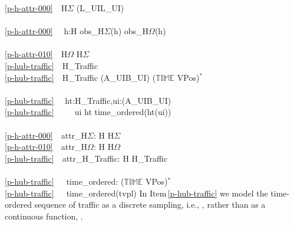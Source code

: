 {\ref{p-h-attr-000}\ \ H$\Sigma$ {\EQ} (L\_UI{\TIMES}L\_UI)\\
\\
\ref{p-h-attr-000}\ \ {\ALL} h:H {\RDOT} obs\_H$\Sigma$(h) {\ISIN} obs\_H$\Omega$(h)\\
\\
\ref{p-h-attr-010}\ \ H$\Omega$ {\EQ} H$\Sigma$\\
\ref{p-hub-traffic}\ \ H\_Traffic\\
\ref{p-hub-traffic}\ \ H\_Traffic {\EQ} (A\_UI{\BAR}B\_UI) {\MARROW} ($\mathbb{TIME}$ {\TIMES} VPos)$^{\ast}$\\
\\
\ref{p-hub-traffic}\ \ {\ALL} ht:H\_Traffic,ui:(A\_UI{\BAR}B\_UI) {\RDOT} \\
\ref{p-hub-traffic}\ \ \ \ \ ui {\ISIN}  ht {\DBLRIGHTARROW} time\_ordered(ht(ui))\\
 \\
\ref{p-h-attr-000}\ \ attr\_H$\Sigma$: H {\RIGHTARROW} H$\Sigma$\\
\ref{p-h-attr-010}\ \ attr\_H$\Omega$: H {\RIGHTARROW} H$\Omega$ \\
\ref{p-hub-traffic}\ \ attr\_H\_Traffic: H {\RIGHTARROW} H\_Traffic\\
\\
\ref{p-hub-traffic}\ \ \ time\_ordered: ($\mathbb{TIME}$ {\TIMES} VPos)$^{\ast}$ {\RIGHTARROW} \\
\ref{p-hub-traffic}\ \ \ time\_ordered(tvpl) {\IS} {\DOTDOTDOT}
\ep
\noindent
\begynd
\pind In Item\,\vref{p-hub-traffic} we model the time-ordered sequence
      of traffic as a discrete sampling, i.e., {\MARROW}, rather than as a
      continuous function, {\RIGHTARROW}.
\afslut
}

%

